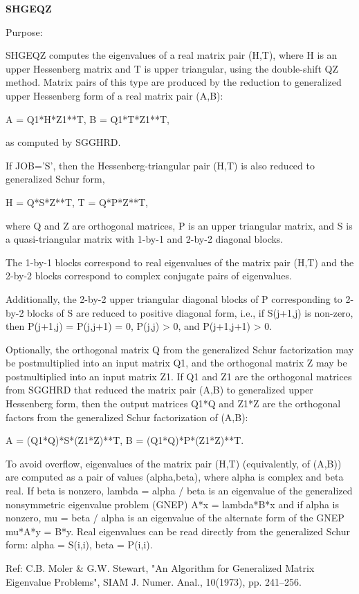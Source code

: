 {\bfseries S\+H\+G\+E\+Q\+Z} 

 \begin{DoxyParagraph}{Purpose\+: }
\begin{DoxyVerb} SHGEQZ computes the eigenvalues of a real matrix pair (H,T),
 where H is an upper Hessenberg matrix and T is upper triangular,
 using the double-shift QZ method.
 Matrix pairs of this type are produced by the reduction to
 generalized upper Hessenberg form of a real matrix pair (A,B):

    A = Q1*H*Z1**T,  B = Q1*T*Z1**T,

 as computed by SGGHRD.

 If JOB='S', then the Hessenberg-triangular pair (H,T) is
 also reduced to generalized Schur form,
 
    H = Q*S*Z**T,  T = Q*P*Z**T,
 
 where Q and Z are orthogonal matrices, P is an upper triangular
 matrix, and S is a quasi-triangular matrix with 1-by-1 and 2-by-2
 diagonal blocks.

 The 1-by-1 blocks correspond to real eigenvalues of the matrix pair
 (H,T) and the 2-by-2 blocks correspond to complex conjugate pairs of
 eigenvalues.

 Additionally, the 2-by-2 upper triangular diagonal blocks of P
 corresponding to 2-by-2 blocks of S are reduced to positive diagonal
 form, i.e., if S(j+1,j) is non-zero, then P(j+1,j) = P(j,j+1) = 0,
 P(j,j) > 0, and P(j+1,j+1) > 0.

 Optionally, the orthogonal matrix Q from the generalized Schur
 factorization may be postmultiplied into an input matrix Q1, and the
 orthogonal matrix Z may be postmultiplied into an input matrix Z1.
 If Q1 and Z1 are the orthogonal matrices from SGGHRD that reduced
 the matrix pair (A,B) to generalized upper Hessenberg form, then the
 output matrices Q1*Q and Z1*Z are the orthogonal factors from the
 generalized Schur factorization of (A,B):

    A = (Q1*Q)*S*(Z1*Z)**T,  B = (Q1*Q)*P*(Z1*Z)**T.
 
 To avoid overflow, eigenvalues of the matrix pair (H,T) (equivalently,
 of (A,B)) are computed as a pair of values (alpha,beta), where alpha is
 complex and beta real.
 If beta is nonzero, lambda = alpha / beta is an eigenvalue of the
 generalized nonsymmetric eigenvalue problem (GNEP)
    A*x = lambda*B*x
 and if alpha is nonzero, mu = beta / alpha is an eigenvalue of the
 alternate form of the GNEP
    mu*A*y = B*y.
 Real eigenvalues can be read directly from the generalized Schur
 form: 
   alpha = S(i,i), beta = P(i,i).

 Ref: C.B. Moler & G.W. Stewart, "An Algorithm for Generalized Matrix
      Eigenvalue Problems", SIAM J. Numer. Anal., 10(1973),
      pp. 241--256.\end{DoxyVerb}
 
\end{DoxyParagraph}

